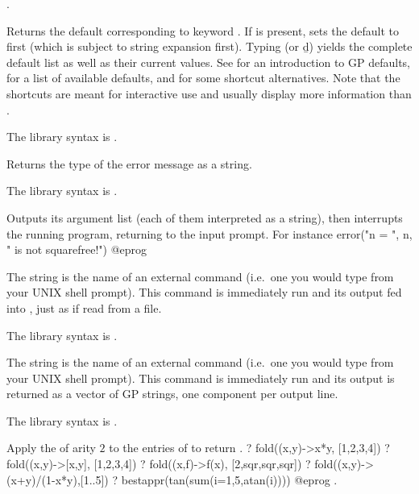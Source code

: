 .

\label{se:default}
Returns the default corresponding to keyword . If  is
present, sets the default to  first (which is subject to string
expansion first). Typing  (or \b{d}) yields the complete
default list as well as their current values. See  for an
introduction to GP defaults,  for a
list of available defaults, and  for some shortcut
alternatives. Note that the shortcuts are meant for interactive use and
usually display more information than .

The library syntax is .

\label{se:errname}
Returns the type of the error message  as a string.

The library syntax is .

\label{se:error}
Outputs its argument list (each of
them interpreted as a string), then interrupts the running  program,
returning to the input prompt. For instance
\bprog
error("n = ", n, " is not squarefree!")
@eprog\noindent

\label{se:extern}
The string  is the name of an external command (i.e.~one you
would type from your UNIX shell prompt). This command is immediately run and
its output fed into , just as if read from a file.

The library syntax is .

\label{se:externstr}
The string  is the name of an external command (i.e.~one you
would type from your UNIX shell prompt). This command is immediately run and
its output is returned as a vector of GP strings, one component per output
line.

The library syntax is .

\label{se:fold}
Apply the   of arity $2$ to the entries of 
to return .
\bprog
? fold((x,y)->x*y, [1,2,3,4])
? fold((x,y)->[x,y], [1,2,3,4])
? fold((x,f)->f(x), [2,sqr,sqr,sqr])
? fold((x,y)->(x+y)/(1-x*y),[1..5])
? bestappr(tan(sum(i=1,5,atan(i))))
@eprog
.

